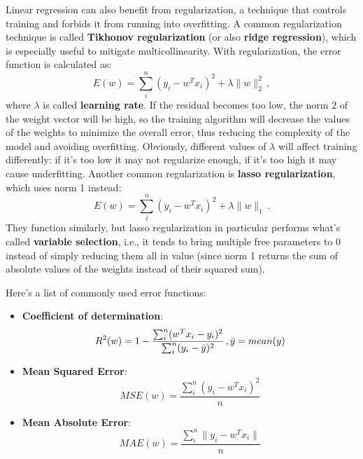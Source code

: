 Linear regression can also benefit from regularization, a technique that controls training and forbids it from running into overfitting. A common regularization technique is called \textbf{Tikhonov regularization} (or also \textbf{ridge regression}), which is especially useful to mitigate multicollinearity. With regularization, the error function is calculated as:
\begin{equation*}
    E(w) = \sum_i^n (y_i - w^Tx_i)^2 + \lambda \|w\|_2^2 \,,
\end{equation*}
where $\lambda$ is called \textbf{learning rate}. If the residual becomes too low, the norm 2 of the weight vector will be high, so the training algorithm will decrease the values of the weights to minimize the overall error, thus reducing the complexity of the model and avoiding overfitting. Obviously, different values of $\lambda$ will affect training differently: if it's too low it may not regularize enough, if it's too high it may cause underfitting. Another common regularization is \textbf{lasso regularization}, which uses norm 1 instead:
\begin{equation*}
    E(w) = \sum_i^n (y_i - w^Tx_i)^2 + \lambda \|w\|_1 \,.
\end{equation*}
They function similarly, but lasso regularization in particular performs what's called \textbf{variable selection}, i.e., it tends to bring multiple free parameters to 0 instead of simply reducing them all in value (since norm 1 returns the sum of absolute values of the weights instead of their squared sum).

Here's a list of commonly used error functions:
\begin{itemize}
    \item \textbf{Coefficient of determination}:
    \begin{equation*}
        R^2(w) = 1 - \dfrac{\sum_i^n (w^Tx_i - y_i)^2}{\sum_i^n (y_i - \Bar{y})^2} \,, \Bar{y} = mean(y)
    \end{equation*}

    \item \textbf{Mean Squared Error}:
    \begin{equation*}
        MSE(w) = \dfrac{\sum_i^n (y_i - w^T x_i)^2}{n}
    \end{equation*}

    \item \textbf{Mean Absolute Error}:
    \begin{equation*}
        MAE(w) = \dfrac{\sum_i^n \|y_i - w^T x_i\|}{n}
    \end{equation*}
\end{itemize}


